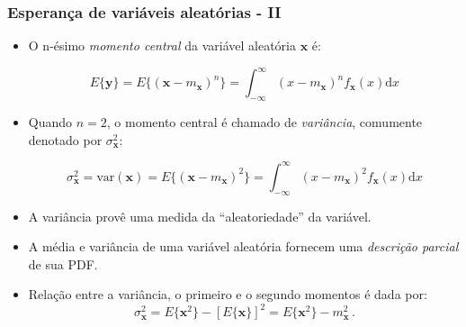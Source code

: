 \begin{frame}
    \frametitle{Esperança de variáveis aleatórias - II}

    \begin{itemize}
     \item O n-ésimo \textit{momento central} da variável aleatória $\mathbf{x}$ é:

      \begin{equation}
	E\{\mathbf{y}\} = E\{(\mathbf{x} - m_{\mathbf{x}})^n\} = \int_{-\infty}^{\infty} (x-m_{\mathbf{x}})^n f_{\mathbf{x}}(x) \mathrm{d}x
      \end{equation}

      \item Quando $n=2$, o momento central é chamado de \textit{variância}, comumente denotado por $\sigma_{\mathbf{x}}^2$:

      \begin{equation}
	\sigma_{\mathbf{x}}^2 = \mathrm{var}(\mathbf{x}) = E\{(\mathbf{x} - m_{\mathbf{x}})^2\} = \int_{-\infty}^{\infty} (x-m_{\mathbf{x}})^2 f_{\mathbf{x}}(x) \mathrm{d}x
      \end{equation}
    
    \item A variância provê uma medida da ``aleatoriedade'' da variável.
    \item A média e variância de uma variável aleatória fornecem uma \textit{descrição parcial} de sua PDF.
    \item Relação entre a variância, o primeiro e o segundo momentos é dada por:
      \begin{equation}
	\sigma_{\mathbf{x}}^2 = E\{\mathbf{x}^2\} - [E\{\mathbf{x}\}]^2 = E\{\mathbf{x}^2\} - m_{\mathbf{x}}^2 \, .
      \end{equation}
    \end{itemize}
\end{frame}


